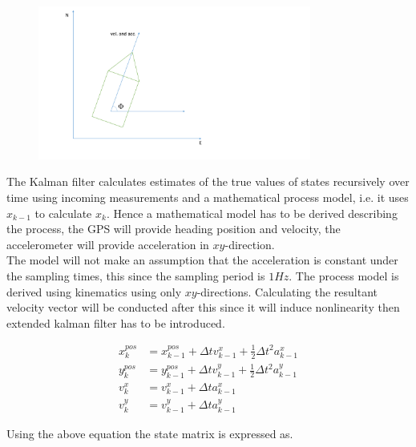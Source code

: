 \begin{figure}[H]
\centering
\includegraphics[width=0.8\textwidth]{b_t.pdf}
\caption{}
\label{bat}
\end{figure}

The Kalman filter calculates estimates of the true values of states recursively over time using incoming measurements and a mathematical process model, i.e. it uses $x_{k-1}$ to calculate $x_k$. Hence a mathematical model has to be derived describing the process, the GPS will provide heading position and velocity, the accelerometer will provide acceleration in $xy$-direction.\\
The model will not make an assumption that the acceleration is constant under the sampling times, this since the sampling period is $1Hz$. The process model is derived using kinematics using only $xy$-directions. Calculating the resultant velocity vector will be conducted after this since it will induce nonlinearity then extended kalman filter has to be introduced.

\begin{align}
x^{pos}_{k}&=x^{pos}_{k-1}+\Delta tv^{x}_{k-1}+\frac{1}{2}\Delta t^2a^x_{k-1}\\
y^{pos}_{k}&=y^{pos}_{k-1}+\Delta tv^{y}_{k-1}+\frac{1}{2}\Delta t^2a^y_{k-1}\\
v^{x}_{k}&=v^{x}_{k-1}+\Delta ta^x_{k-1}\\
v^{y}_{k}&=v^{y}_{k-1}+\Delta ta^y_{k-1}
\end{align}

Using the above equation the state matrix is expressed as.

